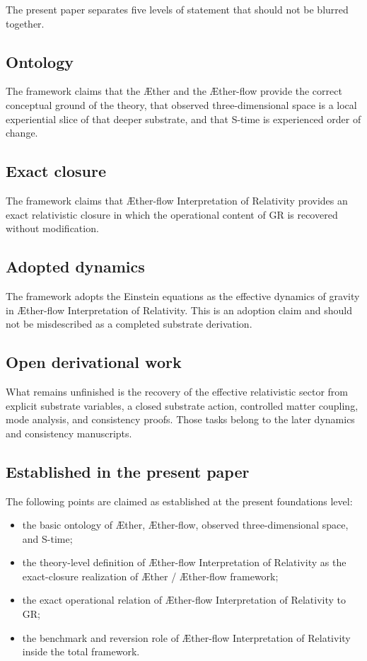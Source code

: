\documentclass[11pt]{article}
\newcommand{\Aether}{\AE{}ther}
\newcommand{\Aflow}{\AE{}ther-flow}
\newcommand{\TheoryName}{\Aflow{} Interpretation of Relativity}
\newcommand{\TheoryProgram}{\Aether{} / \Aflow{} framework}
\begin{document}
The present paper separates five levels of statement that should not be blurred together.

\subsection{Ontology}

The framework claims that the \Aether{} and the \Aflow{} provide the correct conceptual ground of the theory, that observed three-dimensional space is a local experiential slice of that deeper substrate, and that S-time is experienced order of change.

\subsection{Exact closure}

The framework claims that \TheoryName{} provides an exact relativistic closure in which the operational content of GR is recovered without modification.

\subsection{Adopted dynamics}

The framework adopts the Einstein equations as the effective dynamics of gravity in \TheoryName{}. This is an adoption claim and should not be misdescribed as a completed substrate derivation.

\subsection{Open derivational work}

What remains unfinished is the recovery of the effective relativistic sector from explicit substrate variables, a closed substrate action, controlled matter coupling, mode analysis, and consistency proofs. Those tasks belong to the later dynamics and consistency manuscripts.

\subsection{Established in the present paper}

The following points are claimed as established at the present foundations level:
\begin{itemize}
    \item the basic ontology of \Aether{}, \Aflow{}, observed three-dimensional space, and S-time;
    \item the theory-level definition of \TheoryName{} as the exact-closure realization of \TheoryProgram{};
    \item the exact operational relation of \TheoryName{} to GR;
    \item the benchmark and reversion role of \TheoryName{} inside the total framework.
\end{itemize}
\end{document}
